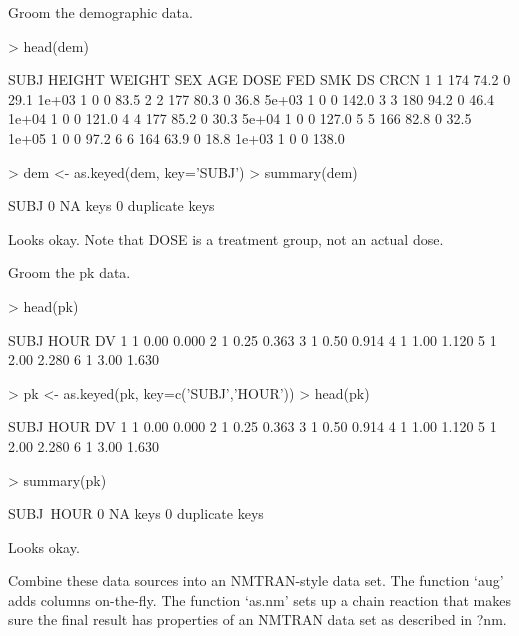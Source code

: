 Groom the demographic data.
\begin{Schunk}
\begin{Sinput}
> head(dem)
\end{Sinput}
\begin{Soutput}
  SUBJ HEIGHT WEIGHT SEX  AGE  DOSE FED SMK DS  CRCN
1    1    174   74.2   0 29.1 1e+03   1   0  0  83.5
2    2    177   80.3   0 36.8 5e+03   1   0  0 142.0
3    3    180   94.2   0 46.4 1e+04   1   0  0 121.0
4    4    177   85.2   0 30.3 5e+04   1   0  0 127.0
5    5    166   82.8   0 32.5 1e+05   1   0  0  97.2
6    6    164   63.9   0 18.8 1e+03   1   0  0 138.0
\end{Soutput}
\begin{Sinput}
> dem <- as.keyed(dem, key='SUBJ')
> summary(dem)
\end{Sinput}
\begin{Soutput}
SUBJ
0 NA keys
0 duplicate keys
\end{Soutput}
\end{Schunk}
Looks okay.  Note that DOSE is a treatment group, not an actual dose.

Groom the pk data.
\begin{Schunk}
\begin{Sinput}
> head(pk)
\end{Sinput}
\begin{Soutput}
  SUBJ HOUR    DV
1    1 0.00 0.000
2    1 0.25 0.363
3    1 0.50 0.914
4    1 1.00 1.120
5    1 2.00 2.280
6    1 3.00 1.630
\end{Soutput}
\begin{Sinput}
> pk <- as.keyed(pk, key=c('SUBJ','HOUR'))
> head(pk)
\end{Sinput}
\begin{Soutput}
  SUBJ HOUR    DV
1    1 0.00 0.000
2    1 0.25 0.363
3    1 0.50 0.914
4    1 1.00 1.120
5    1 2.00 2.280
6    1 3.00 1.630
\end{Soutput}
\begin{Sinput}
> summary(pk)
\end{Sinput}
\begin{Soutput}
SUBJ~HOUR
0 NA keys
0 duplicate keys
\end{Soutput}
\end{Schunk}
Looks okay.  

Combine these data sources into an NMTRAN-style data set.
The function `aug' adds columns on-the-fly.
The function `as.nm' sets up a chain reaction that makes sure the
final result has properties of an NMTRAN data set as described in ?nm.

